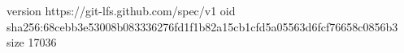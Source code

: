 version https://git-lfs.github.com/spec/v1
oid sha256:68cebb3e53008b083336276fd1f1b82a15cb1cfd5a05563d6fcf76658c0856b3
size 17036
